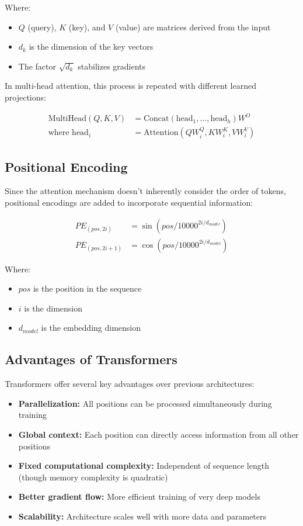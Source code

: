 \documentclass[11pt,a4paper]{report}
\begin{document}
Where:
\begin{itemize}
    \item $Q$ (query), $K$ (key), and $V$ (value) are matrices derived from the input
    \item $d_k$ is the dimension of the key vectors
    \item The factor $\sqrt{d_k}$ stabilizes gradients
\end{itemize}

In multi-head attention, this process is repeated with different learned projections:

\begin{align}
\text{MultiHead}(Q, K, V) &= \text{Concat}(\text{head}_1, \ldots, \text{head}_h)W^O \\
\text{where head}_i &= \text{Attention}(QW_i^Q, KW_i^K, VW_i^V)
\end{align}

\subsection{Positional Encoding}
Since the attention mechanism doesn't inherently consider the order of tokens, positional encodings are added to incorporate sequential information:

\begin{align}
PE_{(pos,2i)} &= \sin(pos/10000^{2i/d_{model}}) \\
PE_{(pos,2i+1)} &= \cos(pos/10000^{2i/d_{model}})
\end{align}

Where:
\begin{itemize}
    \item $pos$ is the position in the sequence
    \item $i$ is the dimension
    \item $d_{model}$ is the embedding dimension
\end{itemize}

\subsection{Advantages of Transformers}
Transformers offer several key advantages over previous architectures:

\begin{itemize}
    \item \textbf{Parallelization:} All positions can be processed simultaneously during training
    \item \textbf{Global context:} Each position can directly access information from all other positions
    \item \textbf{Fixed computational complexity:} Independent of sequence length (though memory complexity is quadratic)
    \item \textbf{Better gradient flow:} More efficient training of very deep models
    \item \textbf{Scalability:} Architecture scales well with more data and parameters
\end{itemize}
\end{document}
